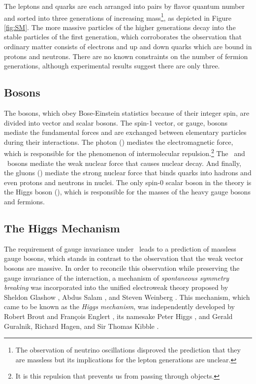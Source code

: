 The leptons and quarks are each arranged into pairs by flavor quantum number and sorted into three generations of increasing mass\footnote{The observation of neutrino oscillations disproved the prediction that they are massless but its implications for the lepton generations are unclear.}, as depicted in Figure \ref{fig:SM}. The more massive particles of the higher generations decay into the stable particles of the first generation, which corroborates the observation that ordinary matter consists of electrons and up and down quarks which are bound in protons and neutrons. There are no known constraints on the number of fermion generations, although experimental results suggest there are only three.

\subsection{Bosons}

The bosons, which obey Bose-Einstein statistics because of their integer spin, are divided into vector and scalar bosons. The spin-1 vector, or gauge, bosons mediate the fundamental forces and are exchanged between elementary particles during their interactions. The photon (\bosg) mediates the electromagnetic force, which is responsible for the phenomenon of intermolecular repulsion.\footnote{It is this repulsion that prevents us from passing through objects.} The \bosW\ and \bosZ\ bosons mediate the weak nuclear force that causes nuclear decay. And finally, the gluons (\bosgln) mediate the strong nuclear force that binds quarks into hadrons and even protons and neutrons in nuclei. The only spin-0 scalar boson in the theory is the Higgs boson (\bosH), which is responsible for the masses of the heavy gauge bosons and fermions.

\subsection{The Higgs Mechanism}

The requirement of gauge invariance under \symWEAK\ leads to a prediction of massless gauge bosons, which stands in contrast to the observation that the weak vector bosons are massive. In order to reconcile this observation while preserving the gauge invariance of the interaction, a mechanism of \textit{spontaneous symmetry breaking} was incorporated into the unified electroweak theory proposed by Sheldon Glashow \cite{EWKGLASHOW}, Abdus Salam \cite{EWKSALAM}, and Steven Weinberg \cite{EWKWEINBERG}. This mechanism, which came to be known as the \textit{Higgs mechanism}, was independently developed by Robert Brout and Fran\c{c}ois Englert \cite{HIGGSBE}, its namesake Peter Higgs \cite{HIGGSH}, and Gerald Guralnik, Richard Hagen, and Sir Thomas Kibble \cite{HIGGSGHK}.

